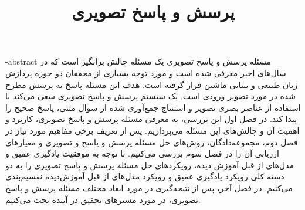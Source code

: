 



\subject{مهندسی کامپیوتر}


\title{پرسش و پاسخ تصویری}







\firstPage
\besmPage

\fa-abstract{
مسئله پرسش و پاسخ تصویری یک مسئله چالش برانگیز است که در سال‌‌های اخیر معرفی شده است و مورد توجه بسیاری از محققان دو حوزه پردازش زبان طبیعی و بینایی ماشین قرار گرفته است. هدف این مسئله پاسخ به پرسش مطرح شده در مورد تصویر ورودی است. یک سیستم پرسش و پاسخ تصویری سعی می‌کند با استفاده از عناصر بصری تصویر و استنتاج جمع‌آوری شده از سوال متنی، پاسخ صحیح را پیدا کند. در فصل اول این بررسی، به معرفی مسئله پرسش و پاسخ تصویری، کاربرد و اهمیت آن و چالش‌های این مسئله می‌پردازیم. پس از تعریف  برخی مفاهیم مورد نیاز در فصل دوم، مجموعه‌دادگان، روش‌های حل مسئله پرسش و پاسخ و تصویری و معیارهای ارزیابی آن را در فصل سوم بررسی می‌کنیم. با توجه به موفقیت ‌یادگیری عمیق و مدل‌های از قبل آموزش دیده، رویکرد‌های حل مسئله پرسش و پاسخ تصویری را به دو دسته کلی رویکرد‌ یادگیری عمیق و رویکرد‌ مدل‌های از قبل آموزش‌‌دیده نقسیم‌بندی می‌کنیم. در فصل آخر، پس از نتیجه‌گیری در مورد ابعاد مختلف مسئله پرسش و پاسخ تصویری، در مورد مسیرهای تحقیق در آینده بحث می‌کنیم.
}
\abstractPage

\newpage
\clearpage